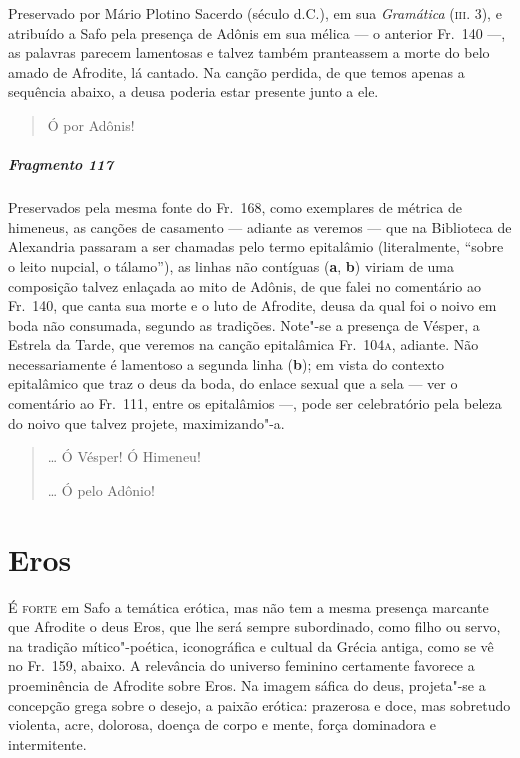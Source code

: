 {\small Preservado por Mário Plotino Sacerdo (século  d.C.), em sua
\emph{Gramática} (\textsc{iii}. 3), e atribuído a Safo pela presença de Adônis em
sua mélica --- o anterior Fr.~140 ---, as palavras parecem lamentosas e
talvez também pranteassem a morte do belo amado de Afrodite, lá cantado. Na canção perdida, de que temos apenas a sequência abaixo, a deusa poderia estar presente junto a ele.}

\begin{verse}
Ó por Adônis!
\end{verse}

\paragraph{Fragmento 117}

{\small Preservados pela mesma fonte do Fr.~168, como exemplares de métrica de
himeneus, as canções de casamento --- adiante as veremos --- que na
Biblioteca de Alexandria passaram a ser chamadas pelo termo epitalâmio
(literalmente, ``sobre o leito nupcial, o tálamo''), as linhas não contíguas (\textbf{a}, \textbf{b}) viriam de uma composição talvez enlaçada ao mito de Adônis, de que falei no
comentário ao Fr.~140, que canta sua morte e o luto de Afrodite, deusa
da qual foi o noivo em boda não consumada, segundo as tradições. Note"-se
a presença de Vésper, a Estrela da Tarde, que veremos na canção
epitalâmica Fr.~104\textsc{a}, adiante. Não necessariamente é lamentoso a segunda linha
(\textbf{b}); em vista do contexto epitalâmico que traz o deus da boda, do
enlace sexual que a sela --- ver o comentário ao Fr.~111, entre os
epitalâmios ---, pode ser celebratório pela beleza do noivo que talvez projete, maximizando"-a.}

\begin{verse}
\ldots{} Ó Vésper! Ó Himeneu!

\ast\quad\ast\quad\ast

\ldots{} Ó pelo Adônio!
\end{verse}


\chapter{Eros}

\textsc{É forte} em Safo a temática erótica, mas não tem a mesma presença marcante que
Afrodite o deus Eros, que lhe será sempre subordinado, como filho ou servo, na
tradição mítico"-poética, iconográfica e cultual da Grécia antiga, como se vê no
Fr.~159, abaixo. A relevância do universo feminino certamente favorece a
proeminência de Afrodite sobre Eros. Na imagem sáfica do deus, projeta"-se a
concepção grega sobre o desejo, a paixão erótica: prazerosa e doce, mas
sobretudo violenta, acre, dolorosa, doença de corpo e mente, força dominadora e
intermitente.

